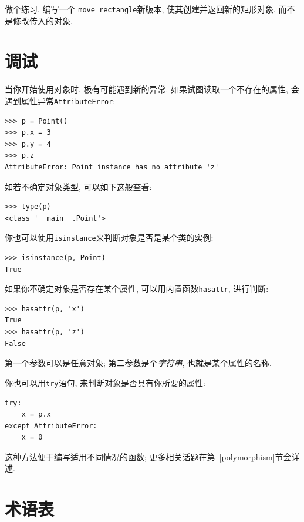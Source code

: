 \documentclass[10pt]{book}
\begin{document}
做个练习, 编写一个 \verb"move_rectangle"新版本, 
使其创建并返回新的矩形对象, 而不是修改传入的对象. 

\section{调试}
\label{hasattr}

当你开始使用对象时, 极有可能遇到新的异常. 
如果试图读取一个不存在的属性, 会遇到属性异常{\tt AttributeError}:

\begin{verbatim}
>>> p = Point()
>>> p.x = 3
>>> p.y = 4
>>> p.z
AttributeError: Point instance has no attribute 'z'
\end{verbatim}
%
如若不确定对象类型, 可以如下这般查看:

\begin{verbatim}
>>> type(p)
<class '__main__.Point'>
\end{verbatim}
%
你也可以使用{\tt isinstance}来判断对象是否是某个类的实例:

\begin{verbatim}
>>> isinstance(p, Point)
True
\end{verbatim}
%
如果你不确定对象是否存在某个属性, 
可以用内置函数{\tt hasattr}, 进行判断:

\begin{verbatim}
>>> hasattr(p, 'x')
True
>>> hasattr(p, 'z')
False
\end{verbatim}
%
第一个参数可以是任意对象;
第二参数是个{\em 字符串}, 也就是某个属性的名称. 

你也可以用{\tt try}语句, 来判断对象是否具有你所要的属性:

\begin{verbatim}
try:
    x = p.x
except AttributeError:
    x = 0
\end{verbatim}

这种方法便于编写适用不同情况的函数;
更多相关话题在第~\ref{polymorphism}节会详述. 


\section{术语表}
\end{document}
